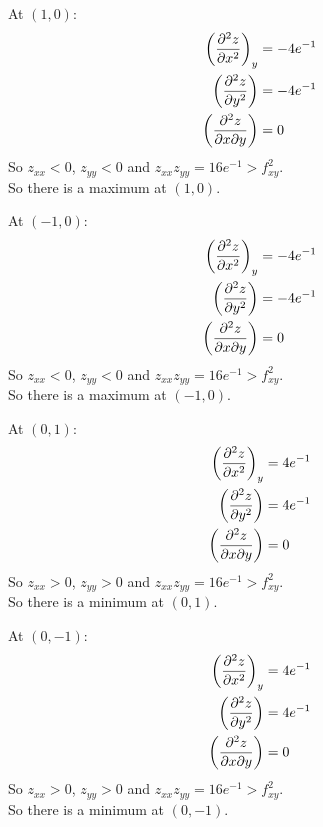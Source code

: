 \documentclass[10pt,\jkfside,a4paper]{article}
\begin{document}
\begin{enumerate}
\begin{enumerate}
At $(1, 0)$:
\begin{equation}
\begin{split}
\left(\pdv[2]{z}{x}\right)_y &= -4e^{-1} \\
\left(\pdv[2]{z}{y}\right) &= -4e^{-1} \\
\left(\pdv[2]{z}{x}{y}\right) &= 0 \\
\end{split}
\end{equation}
So $z_{xx} < 0$, $z_{yy} < 0$ and $z_{xx}z_{yy} = 16e^{-1} > f^2_{xy}$.\\
So there is a maximum at $(1, 0)$.

At $(-1, 0)$:
\begin{equation}
\begin{split}
\left(\pdv[2]{z}{x}\right)_y &= -4e^{-1} \\
\left(\pdv[2]{z}{y}\right) &= -4e^{-1} \\
\left(\pdv[2]{z}{x}{y}\right) &= 0 \\
\end{split}
\end{equation}
So $z_{xx} < 0$, $z_{yy} < 0$ and $z_{xx}z_{yy} = 16e^{-1} > f^2_{xy}$.\\
So there is a maximum at $(-1, 0)$.

At $(0, 1)$:
\begin{equation}
\begin{split}
\left(\pdv[2]{z}{x}\right)_y &= 4e^{-1} \\
\left(\pdv[2]{z}{y}\right) &= 4e^{-1} \\
\left(\pdv[2]{z}{x}{y}\right) &= 0 \\
\end{split}
\end{equation}
So $z_{xx} > 0$, $z_{yy} > 0$ and $z_{xx}z_{yy} = 16e^{-1} > f^2_{xy}$.\\
So there is a minimum at $(0, 1)$.

At $(0, -1)$:
\begin{equation}
\begin{split}
\left(\pdv[2]{z}{x}\right)_y &= 4e^{-1} \\
\left(\pdv[2]{z}{y}\right) &= 4e^{-1} \\
\left(\pdv[2]{z}{x}{y}\right) &= 0 \\
\end{split}
\end{equation}
So $z_{xx} > 0$, $z_{yy} > 0$ and $z_{xx}z_{yy} = 16e^{-1} > f^2_{xy}$.\\
So there is a minimum at $(0, -1)$.


\end{enumerate}
\end{enumerate}
\end{document}
